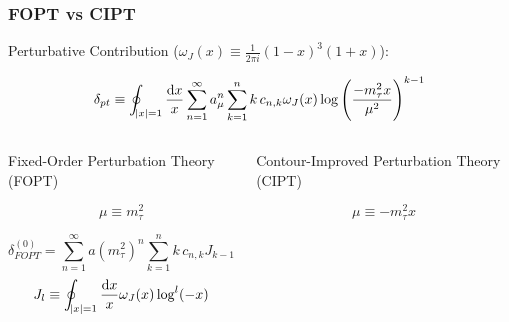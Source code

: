 \documentclass{beamer}
\begin{document}
\begin{frame}
  \frametitle{FOPT vs CIPT}
  \begin{small}
    Perturbative Contribution (\(\omega_J(x) \equiv \frac{1}{2\pi i} (1-x)^3(1+x)\)):
    \begin{ceqn}
      \begin{equation}
        \delta_{pt} \equiv \oint_{\abs{x}=1} \frac{\dif x}{x} \sum_{n=1}^\infty a_\mu^n \sum_{k=1}^n k\, c_{n,k}  \omega_J(x) \log \left( \frac{-m_\tau^2 x}{\mu^2} \right)^{k-1}
      \end{equation}
    \end{ceqn}
    \centering
    \begin{columns}
      \begin{column}{.5\textwidth}
        \centering
        Fixed-Order Perturbation Theory (FOPT)
        \begin{ceqn}
          \begin{equation*}
            \mu \equiv m_\tau^2
          \end{equation*}
          \begin{scriptsize}
            \begin{equation}
              \delta_{FOPT}^{(0)} = \sum_{n=1}^\infty a(m_\tau^2)^n \sum_{k=1}^n k\, c_{n,k} J_{k-1}
            \end{equation}
            \begin{equation}
              J_l \equiv \oint_{\abs{x}=1} \frac{\dif x}{x} \omega_J(x) \log^l(-x)
            \end{equation}
          \end{scriptsize}
        \end{ceqn}
      \end{column}
      \begin{column}{.5\textwidth}
        \centering
        Contour-Improved Perturbation Theory (CIPT)
        \begin{ceqn}
          \begin{scriptsize}
            \begin{equation}
              \mu \equiv -m_\tau^2 x
            \end{equation}

\end{scriptsize}
\end{ceqn}
\end{column}
\end{columns}
\end{small}
\end{frame}
\end{document}
